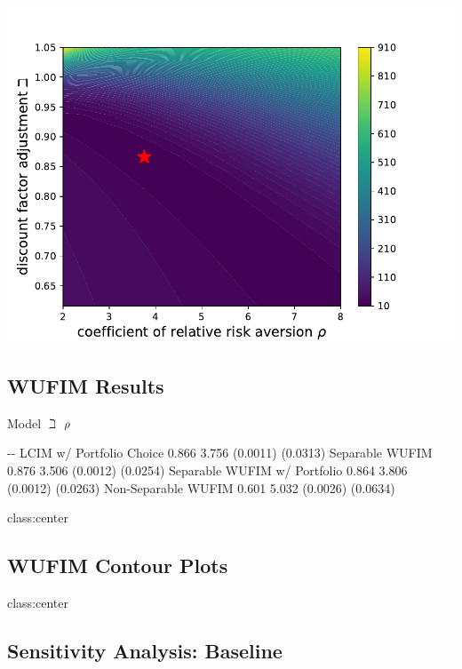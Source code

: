 \documentclass[
  letterpaper,
  DIV=11,
  numbers=noendperiod]{scrartcl}
\begin{document}
\includegraphics{slides_files/mediabag/../Figures/IndShockSMMcontour.pdf}

\subsection{WUFIM Results}\label{wufim-results}

Model \textbar{} \(\beth\) \textbar{} \(\rho\) \textbar{}

\textbar\textbar-\textbar-\textbar{} \textbar{} LCIM w/ Portfolio Choice
\textbar{} 0.866 \textbar{} 3.756 \textbar{} \textbar{} \textbar{}
(0.0011) \textbar{} (0.0313) \textbar{} \textbar{} Separable WUFIM
\textbar{} 0.876 \textbar{} 3.506 \textbar{} \textbar{} \textbar{}
(0.0012) \textbar{} (0.0254) \textbar{} \textbar{} Separable WUFIM w/
Portfolio \textbar{} 0.864 \textbar{} 3.806 \textbar{} \textbar{}
\textbar{} (0.0012) \textbar{} (0.0263) \textbar{} \textbar{}
Non-Separable WUFIM \textbar{} 0.601 \textbar{} 5.032 \textbar{}
\textbar{} \textbar{} (0.0026) \textbar{} (0.0634) \textbar{}

class:center

\subsection{WUFIM Contour Plots}\label{wufim-contour-plots}

class:center

\subsection{Sensitivity Analysis:
Baseline}\label{sensitivity-analysis-baseline}
\end{document}
